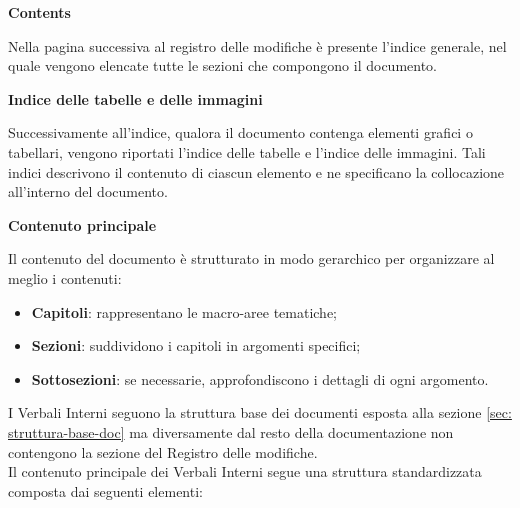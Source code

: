 \begin{center}
\textbf{Contents}
\end{center}
\vspace{-0.5em}
Nella pagina successiva al registro delle modifiche è presente l'indice generale, nel quale vengono elencate tutte le sezioni che compongono il documento.

\begin{center}
\textbf{Indice delle tabelle e delle immagini}
\end{center}
\vspace{-0.5em}
Successivamente all'indice, qualora il documento contenga elementi grafici o tabellari, vengono riportati l'indice delle tabelle e l'indice delle immagini. 
Tali indici descrivono il contenuto di ciascun elemento e ne specificano la collocazione all'interno del documento.

\begin{center}
\textbf{Contenuto principale}
\end{center}
\vspace{-0.5em}
Il contenuto del documento è strutturato in modo gerarchico per organizzare al meglio i contenuti:
\begin{itemize}[itemsep=3pt, parsep=1pt, label=$\scriptstyle\bullet$]
    \item \textbf{Capitoli}: rappresentano le macro-aree tematiche;
    \item \textbf{Sezioni}: suddividono i capitoli in argomenti specifici;
    \item \textbf{Sottosezioni}: se necessarie, approfondiscono i dettagli di ogni argomento.
\end{itemize}
\vspace{0.1em}

\label{sec:verbali-interni}
I Verbali Interni seguono la struttura base dei documenti esposta alla sezione \ref{sec: struttura-base-doc} ma diversamente dal resto della documentazione non contengono la sezione del Registro delle modifiche.\\
Il contenuto principale dei Verbali Interni segue una struttura standardizzata composta dai seguenti elementi: \vspace{-0.5em}

